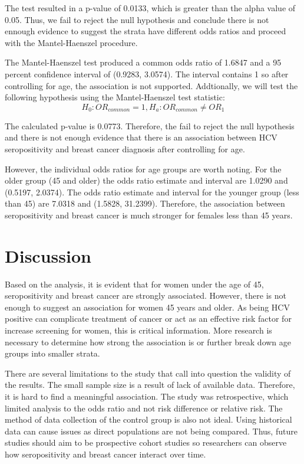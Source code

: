 \documentclass[12pt, titlepage]{article}
\begin{document}
The test resulted in a p-value of 0.0133, which is greater than
the alpha value of 0.05. Thus, we fail to reject the null hypothesis 
and conclude there is not ennough evidence to suggest the strata have different
odds ratios and proceed with the Mantel-Haenszel procedure. 

The Mantel-Haenszel test produced a common odds ratio of 1.6847 and 
a 95 percent confidence interval of (0.9283, 3.0574). The interval
contains 1 so after controlling for age, the association is not supported.
Addtionally, we will test the following hypothesis using the Mantel-Haenszel 
test statistic:
\[
H_{0}:OR_{common}=1, H_{a}:OR_{common}\neq{OR_{1}}
\]

The calculated p-value is 0.0773. Therefore, the fail to reject the null 
hypothesis and there is not enough evidence that there is an association 
between HCV seropositivity and breast cancer diagnosis after controlling for 
age. 

However, the individual odds ratios for age groups are worth noting. For 
the older group (45 and older) the odds ratio estimate and interval are 
1.0290 and (0.5197, 2.0374). The odds ratio estimate and interval for the 
younger group (less than 45) are 7.0318 and (1.5828, 31.2399). Therefore,
the association between seropositivity and breast cancer is much stronger
for females less than 45 years. 

\section{Discussion}
\label{sec:discuss}
  Based on the analysis, it is evident that for women under the age of 45,
seropositivity and breast cancer are strongly associated. However, there 
is not enough to suggest an association for women 45 years and older. 
As being HCV positive can complicate treatment of cancer or act as 
an effective risk factor for increase screening for women, this is 
critical information. More research is necessary to determine how strong 
the association is or further break down age groups into smaller strata.

There are several limitations to the study that call into question the 
validity of the results. The small sample size is a result of lack 
of available data. Therefore, it is hard to find a meaningful 
association. The study was retrospective, which limited analysis to 
the odds ratio and not risk difference or relative risk. The method 
of data collection of the control group is also not ideal. Using historical 
data can cause issues as direct populations are not being compared. 
Thus, future studies should aim to be prospective cohort studies so 
researchers can observe how seropositivity and breast cancer interact 
over time. 
\end{document}
